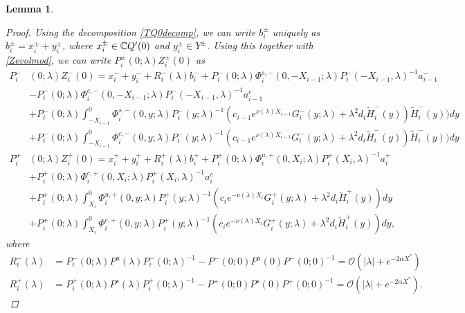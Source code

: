 \documentclass[12pt]{elsarticle}
\theoremstyle{plain}
\newtheorem{lemma}[theorem]{Lemma}
\theoremstyle{definition}
\theoremstyle{remark}
\numberwithin{theorem}{section}
\numberwithin{equation}{section}
\begin{document}
\begin{lemma}
\begin{proof}
Using the decomposition \cref{TQ0decomp}, we can write $b_i^\pm$ uniquely as $b_i^\pm = x_i^\pm + y_i^\pm$, where $x_i^\pm \in \mathbb{C} Q'(0)$ and $y_i^\pm \in Y^\pm$. Using this together with \cref{Zevolmod}, we can write $P_i^\pm(0; \lambda) Z_i^\pm(0)$ as
\begin{equation}\label{PipmZ0}
\begin{aligned}
P_i^-&(0; \lambda) Z_i^-(0) = x_i^- + y_i^- + R_i^-(\lambda) b_i^- + P_i^-(0; \lambda) \Phi_i^{s,-}(0, -X_{i-1}; \lambda) P_i^-(-X_{i-1}, \lambda)^{-1} a_{i-1}^- \\
&- P_i^-(0; \lambda) \Phi_i^{c,-}(0, -X_{i-1}; \lambda) P_i^-(-X_{i-1}, \lambda)^{-1} a_{i-1}^c \\
&+ P_i^-(0; \lambda) \int_{-X_{i-1}}^0 \Phi_i^{s,-}(0, y; \lambda) P_i^-(y; \lambda)^{-1} (c_{i-1} e^{\nu(\lambda)X_{i-1}}
 G_i^-(y; \lambda) + \lambda^2 d_i \tilde{H}_i^-(y)) \tilde{H}_i^-(y)) dy \\
&+ P_i^-(0; \lambda) \int_{-X_{i-1}}^0 \Phi_i^{c,-}(0, y; \lambda) P_i^-(y; \lambda)^{-1} (c_{i-1} e^{\nu(\lambda)X_{i-1}}
 G_i^-(y; \lambda) + \lambda^2 d_i \tilde{H}_i^-(y)) \tilde{H}_i^-(y)) dy  \\ 
P_i^+&(0; \lambda) Z_i^+(0) = x_i^+ + y_i^+ + R_i^+(\lambda) b_i^+ + P_i^+(0; \lambda) \Phi_i^{u,+}(0, X_i; \lambda) P_i^+(X_i, \lambda)^{-1} a_i^+ \\
&+ P_i^+(0; \lambda) \Phi_i^{c,+}(0, X_i; \lambda) P_i^+(X_i, \lambda)^{-1} a_i^c \\
&+ P_i^+(0; \lambda) \int_{X_i}^0 \Phi_i^{u,+}(0, y; \lambda) P_i^+(y; \lambda)^{-1}( c_i e^{-\nu(\lambda)X_i} G_i^+(y; \lambda) + \lambda^2 d_i \tilde{H}_i^+(y)) dy \\
&+ P_i^+(0; \lambda) \int_{X_i}^0 \Phi_i^{c,+}(0, y; \lambda) P_i^+(y; \lambda)^{-1}( c_i e^{-\nu(\lambda)X_i} G_i^+(y; \lambda) + \lambda^2 d_i \tilde{H}_i^+(y)) dy,
\end{aligned}
\end{equation}
where 
\begin{equation}\label{Ripmbound}
\begin{aligned}
R_i^-(\lambda) &= P_i^-(0; \lambda) P^u(\lambda) P_i^-(0; \lambda)^{-1} 
- P^-(0; 0) P^u(0) P^-(0; 0)^{-1} = \mathcal{O}(|\lambda| + e^{-2 \alpha X^*}) \\
R_i^+(\lambda) &= P_i^+(0; \lambda) P^s(\lambda) P_i^+(0; \lambda)^{-1} 
- P^+(0; 0) P^s(0) P^+(0; 0)^{-1} = \mathcal{O}(|\lambda| + e^{-2 \alpha X^*}).
\end{aligned}

\end{equation}
\end{proof}
\end{lemma}
\end{document}
